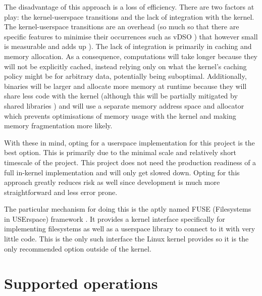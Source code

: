         The disadvantage of this approach is a loss of efficiency. There are
        two factors at play: the kernel-userspace transitions and the lack of
        integration with the kernel. The kernel-userspace transitions are an
        overhead (so much so that there are specific features to minimise their
        occurrences such as vDSO \cite{man_vDSO}) that however small is
        measurable and adds up \cite{Linux_context_switch_overhead}). The lack
        of integration is primarily in caching and memory allocation. As a
        consequence, computations will take longer because they will not be
        explicitly cached, instead relying only on what the kernel's caching
        policy might be for arbitrary data, potentially being suboptimal.
        Additionally, binaries will be larger and allocate more memory at
        runtime because they will share less code with the kernel (although
        this will be partially mitigated by shared libraries
        \cite{shared_libraries}) and will use a separate memory address space
        and allocator which prevents optimisations of memory usage with the
        kernel and making memory fragmentation more likely.

        With these in mind, opting for a userspace implementation for this
        project is the best option. This is primarily due to the minimal scale
        and relatively short timescale of the project. This project does not
        need the production readiness of a full in-kernel implementation and
        will only get slowed down. Opting for this approach greatly reduces
        risk as well since development is much more straightforward and less
        error prone.

        The particular mechanism for doing this is the aptly named FUSE
        (Filesystems in USErspace) framework \cite{FUSE}. It provides a kernel
        interface specifically for implementing filesystems as well as a
        userspace library to connect to it with very little code. This is the
        only such interface the Linux kernel provides so it is the only
        recommended option outside of the kernel.

    \section{Supported operations}
        \label{sec:operations}

